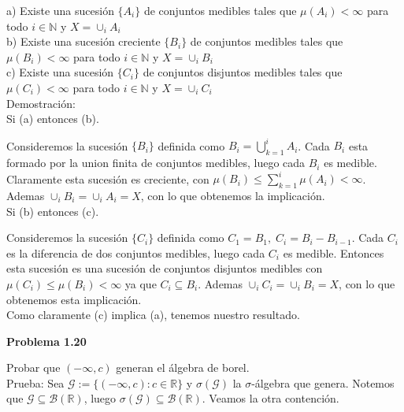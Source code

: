 \documentclass[12pt]{article}
\begin{document}
    a) Existe una sucesi\'on $\{A_i\}$ de conjuntos medibles tales que $\mu(A_i) < \infty$
    para todo $i\in \mathbb{N}$ \hspace*{29pt} y $X = \cup_i A_i$
    \\

    b) Existe una sucesi\'on creciente $\{B_i\}$ de conjuntos medibles tales que 
    $\mu(B_i) < \infty$ para \hspace*{29pt} todo $i\in \mathbb{N}$ y $X = \cup_i B_i$
    \\

    c) Existe una sucesi\'on $\{C_i\}$ de conjuntos disjuntos medibles tales que 
    $\mu(C_i) < \infty$ para \hspace*{29pt} todo $i\in \mathbb{N}$ y $X = \cup_i C_i$
    \\

    Demostraci\'on: 
    \\

    Si (a) entonces (b). 

    Consideremos la sucesi\'on $\{B_i\}$ definida como $B_i = \bigcup_{k=1}^i A_i$.
    Cada $B_i$ esta formado por la union finita de conjuntos medibles, luego cada $B_i$ es medible.
    Claramente esta sucesi\'on es creciente, con 
    $\mu (B_i) \leq \sum_{k=1}^i\mu(A_i) < \infty$. Ademas $\cup_i B_i = \cup_i A_i = X$,
    con lo que obtenemos la implicaci\'on.
    \\

    Si (b) entonces (c).

    Consideremos la sucesi\'on $\{C_i\}$ definida como $C_1 = B_1,\; C_i = B_i-B_{i-1}$. 
    Cada $C_i$ es la diferencia de dos conjuntos medibles, luego cada $C_i$ es medible.
    Entonces esta sucesi\'on es una sucesi\'on de conjuntos disjuntos medibles con 
    $\mu(C_i) \leq \mu(B_i) < \infty$ ya que $C_i \subseteq B_i$. Ademas $\cup_i C_i = \cup_i B_i = X$,
    con lo que obtenemos esta implicaci\'on.
    \\

    Como claramente (c) implica (a), tenemos nuestro resultado.
    \newpage

    \textbf{Problema 1.20}

    Probar que $(-\infty,c)$ generan el \'algebra de borel.
    \\

    Prueba: Sea $\mathcal{G} := \{(-\infty,c) : c\in\mathbb{R}\}$ y $\sigma(\mathcal{G})$ la 
    $\sigma$-\'algebra que genera. Notemos que $\mathcal{G} \subseteq \mathscr{B}(\mathbb{R})$,
    luego $\sigma(\mathcal{G})\subseteq \mathscr{B}(\mathbb{R})$. Veamos la otra contenci\'on.
    \\
\end{document}
